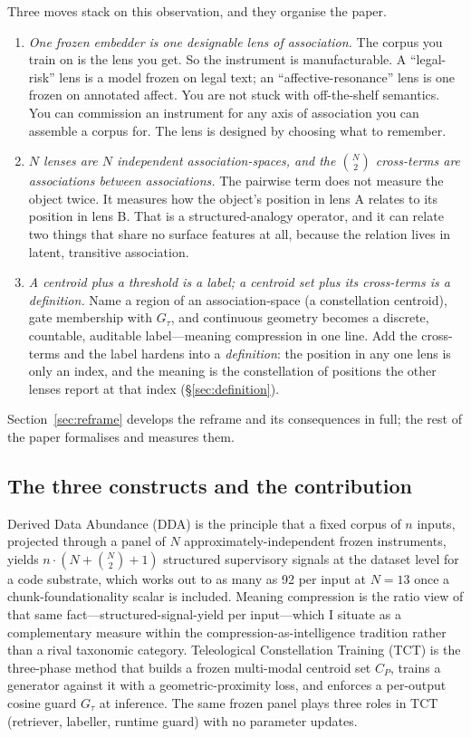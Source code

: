 \documentclass[10pt,twocolumn]{article}
\begin{document}
Three moves stack on this observation, and they organise the paper.
\begin{enumerate}\itemsep0.15em
\item \emph{One frozen embedder is one designable lens of association.} The
corpus you train on is the lens you get. So the instrument is manufacturable. A
``legal-risk'' lens is a model frozen on legal text; an ``affective-resonance''
lens is one frozen on annotated affect. You are not stuck with off-the-shelf
semantics. You can commission an instrument for any axis of association you can
assemble a corpus for. The lens is designed by choosing what to remember.
\item \emph{$N$ lenses are $N$ independent association-spaces, and the
$\binom{N}{2}$ cross-terms are associations between associations.} The pairwise
term does not measure the object twice. It measures how the object's position in
lens A relates to its position in lens B. That is a structured-analogy operator,
and it can relate two things that share no surface features at all, because the
relation lives in latent, transitive association.
\item \emph{A centroid plus a threshold is a label; a centroid set plus its
cross-terms is a definition.} Name a region of an association-space (a
constellation centroid), gate membership with $G_\tau$, and continuous geometry
becomes a discrete, countable, auditable label---meaning compression in one line.
Add the cross-terms and the label hardens into a \emph{definition}: the position
in any one lens is only an index, and the meaning is the constellation of
positions the other lenses report at that index (\S\ref{sec:definition}).
\end{enumerate}
Section~\ref{sec:reframe} develops the reframe and its consequences in full; the
rest of the paper formalises and measures them.

\subsection{The three constructs and the contribution}
Derived Data Abundance (DDA) is the principle that a fixed corpus of $n$ inputs,
projected through a panel of $N$ approximately-independent frozen instruments,
yields $n\cdot(N+\binom{N}{2}+1)$ structured supervisory signals at the dataset
level for a code substrate, which works out to as many as 92 per input at $N=13$
once a chunk-foundationality scalar is included. Meaning compression is the ratio
view of that same fact---structured-signal-yield per input---which I situate as a
complementary measure within the compression-as-intelligence tradition rather
than a rival taxonomic category. Teleological Constellation Training
(TCT) is the three-phase method that builds a frozen multi-modal centroid set
$C_P$, trains a generator against it with a geometric-proximity loss, and
enforces a per-output cosine guard $G_\tau$ at inference. The same frozen panel
plays three roles in TCT (retriever, labeller, runtime guard) with no parameter
updates.
\end{document}
